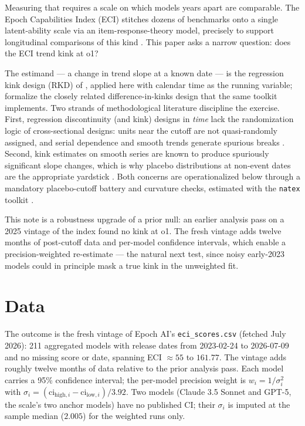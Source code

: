 \documentclass[11pt]{article}
\newcommand{\natex}{\texttt{natex}}
\begin{document}
Measuring that requires a scale on which models years apart are comparable.
The Epoch Capabilities Index (ECI) stitches dozens of benchmarks onto a single
latent-ability scale via an item-response-theory model, precisely to support
longitudinal comparisons of this kind \cite{ho2025}. This paper asks a narrow
question: does the ECI trend kink at o1?

The estimand --- a change in trend slope at a known date --- is the regression
kink design (RKD) of \cite{card2015}, applied here with calendar time as the
running variable; \cite{bockerman2025} formalize the closely related
difference-in-kinks design that the same toolkit implements. Two strands of
methodological literature discipline the exercise. First, regression
discontinuity (and kink) designs in \emph{time} lack the randomization logic
of cross-sectional designs: units near the cutoff are not quasi-randomly
assigned, and serial dependence and smooth trends generate spurious breaks
\cite{hausman2018}. Second, kink estimates on smooth series are known to
produce spuriously significant slope changes, which is why placebo
distributions at non-event dates are the appropriate yardstick
\cite{ganong2018}. Both concerns are operationalized below through a
mandatory placebo-cutoff battery and curvature checks, estimated with the
\natex{} toolkit \cite{natex}.

This note is a robustness upgrade of a prior null: an earlier analysis pass on
a 2025 vintage of the index found no kink at o1. The fresh vintage adds
twelve months of post-cutoff data and per-model confidence intervals, which
enable a precision-weighted re-estimate --- the natural next test, since noisy
early-2023 models could in principle mask a true kink in the unweighted fit.

\section{Data}\label{sec:data}

The outcome is the fresh vintage of Epoch AI's \texttt{eci\_scores.csv}
(fetched July 2026): 211 aggregated models with release dates from 2023-02-24
to 2026-07-09 and no missing score or date, spanning ECI $\approx55$ to
$161.77$. The vintage adds roughly twelve months of data relative to the
prior analysis pass. Each model carries a 95\% confidence interval; the
per-model precision weight is $w_i = 1/\sigma_i^2$ with
$\sigma_i = (\mathrm{ci}_{\mathrm{high},i} - \mathrm{ci}_{\mathrm{low},i})/3.92$.
Two models (Claude 3.5 Sonnet and GPT-5, the scale's two anchor models) have
no published CI; their $\sigma_i$ is imputed at the sample median ($2.005$)
for the weighted runs only.
\end{document}
